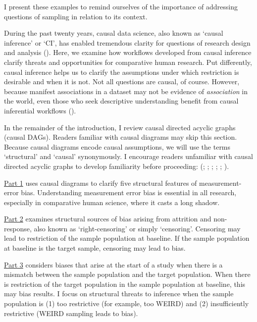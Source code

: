 \documentclass[
  single column]{article}
\begin{document}
I present these examples to remind ourselves of the importance of
addressing questions of sampling in relation to its context.

During the past twenty years, causal data science, also known as `causal
inference' or `CI', has enabled tremendous clarity for questions of
research design and analysis
().
Here, we examine how workflows developed from causal inference clarify
threats and opportunities for comparative human research. Put
differently, causal inference helps us to clarify the assumptions under
which restriction is desirable and when it is not. Not all questions are
causal, of course. However, because manifest associations in a dataset
may not be evidence of \emph{association} in the world, even those who
seek descriptive understanding benefit from causal inferential workflows
().

In the remainder of the introduction, I review causal directed acyclic
graphs (causal DAGs). Readers familiar with causal diagrams may skip
this section. Because causal diagrams encode causal assumptions, we will
use the terms `structural' and `causal' synonymously. I encourage
readers unfamiliar with causal directed acyclic graphs to develop
familiarity before proceeding: (; ;
;
;
;
).

\hyperref[id-sec-1]{Part 1} uses causal diagrams to clarify five
structural features of measurement-error bias. Understanding measurement
error bias is essential in all research, especially in comparative human
science, where it casts a long shadow.

\hyperref[id-sec-2]{Part 2} examines structural sources of bias arising
from attrition and non-response, also known as `right-censoring' or
simply `censoring'. Censoring may lead to restriction of the sample
population at baseline. If the sample population at baseline is the
target sample, censoring may lead to bias.

\hyperref[id-sec-3]{Part 3} considers biases that arise at the start of
a study when there is a mismatch between the sample population and the
target population. When there is restriction of the target population in
the sample population at baseline, this may bias results. I focus on
structural threats to inference when the sample population is (1) too
restrictive (for example, too WEIRD) and (2) insufficiently restrictive
(WEIRD sampling leads to bias).
\end{document}
